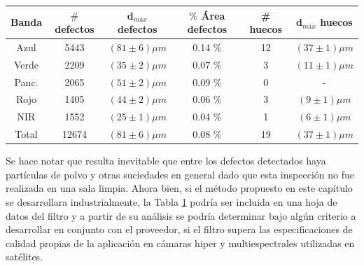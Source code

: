 \begin{table}[H]
\begin{center}
\begin{tabular}{ |c|c|c|c|c|c|}    \toprule
Banda & $\#$ defectos & d$_{máx}$ defectos & $\%$ Área defectos & \# huecos & d$_{máx}$ huecos \\\midrule
\rowcolor{blue!15} Azul   & 5443 & $(81 \pm 6) \mu m$ & 0.14 \% &12  & $(37 \pm 1) \mu m$  \\ 
\rowcolor{green!50} Verde  & 2209 & $(35 \pm 2) \mu m$ & 0.07 \% &3 & $(11 \pm 1) \mu m$\\ 
Panc. & 2065 & $(51 \pm 2) \mu m$ & 0.09 \% &0 & -\\
\rowcolor{red!50} Rojo  & 1405  &$(44 \pm 2) \mu m$& 0.06 \% &3 & $(9 \pm 1) \mu m$\\
\rowcolor{maroon!20} NIR   & 1552 & $(25 \pm 1) \mu m$ & 0.04 \% &1 & $(6 \pm 1) \mu m$ \\ \midrule
Total   & 12674 & $(81 \pm 6) \mu m$ & 0.08 \% & 19 & $(37 \pm 1) \mu m$ \\
\bottomrule
 \hline
\end{tabular}
\end{center}
 \label{tabpobb}
\end{table}

Se hace notar que resulta inevitable que entre los defectos detectados haya partículas de polvo y otras suciedades en general dado que esta inspección no fue realizada en una sala limpia.  Ahora bien, si el método propuesto en este capítulo se desarrollara industrialmente, la Tabla \ref{tabpobb} podría ser incluida en una hoja de datos del filtro y a partir de su análisis se podría determinar bajo algún criterio a desarrollar en conjunto con el proveedor, si el filtro supera las especificaciones de calidad propias de la aplicación en cámaras hiper y multiespectrales utilizadas en satélites. 

